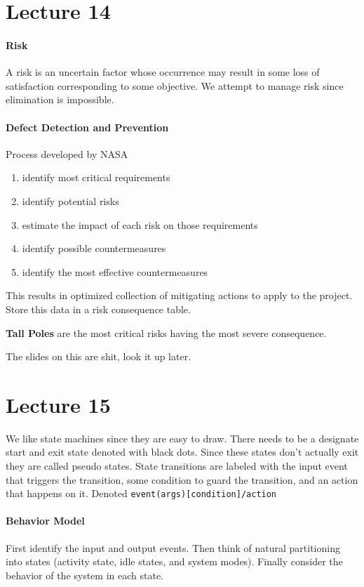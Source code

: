 \documentclass[12pt]{article}
\begin{document}
\section*{Lecture 14}
\label{sec:lecture_14}
\paragraph{Risk} 
\label{par:risk}
A risk is an uncertain factor whose occurrence may result in some loss of satisfaction corresponding to some objective. We attempt to manage risk since elimination is impossible. 

\paragraph{Defect Detection and Prevention} 
\label{par:defect_detection_and_prevention}
Process developed by NASA
\begin{enumerate}
	\item identify most critical requirements
	\item identify potential risks
	\item estimate the impact of each risk on those requirements
	\item identify possible countermeasures
	\item identify the most effective countermeasures
\end{enumerate}

This results in optimized collection of mitigating actions to apply to the project. Store this data in a risk consequence table. 

\textbf{Tall Poles} are the most critical risks having the most severe consequence.

The slides on this are shit, look it up later.

\section*{Lecture 15}
\label{sec:lecture_15}
We like state machines since they are easy to draw. There needs to be a designate start and exit state denoted with black dots. Since these states don't actually exit they are called pseudo states. State transitions are labeled with the input event that triggers the transition, some condition to guard the transition, and an action that happens on it. Denoted \texttt{event(args)[condition]/action}

\paragraph{Behavior Model} 
\label{par:behavior_model}
First identify the input and output events. Then think of natural partitioning into states (activity state, idle states, and system modes). Finally consider the behavior of the system in each state. 
\end{document}
